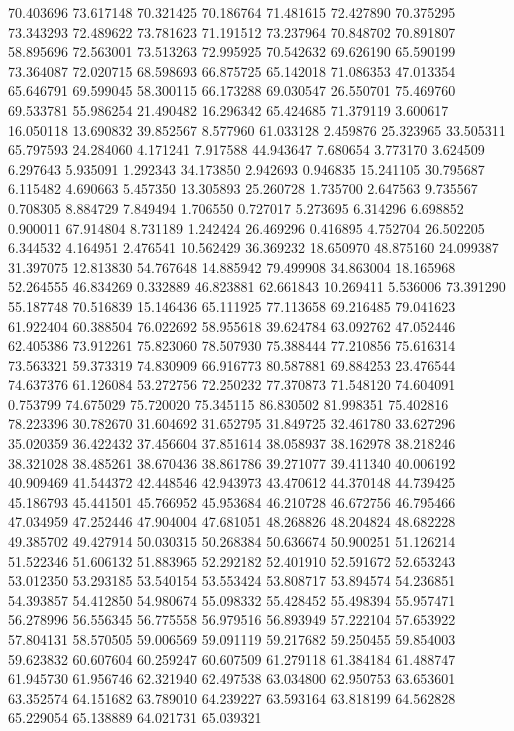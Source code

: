70.403696
73.617148
70.321425
70.186764
71.481615
72.427890
70.375295
73.343293
72.489622
73.781623
71.191512
73.237964
70.848702
70.891807
58.895696
72.563001
73.513263
72.995925
70.542632
69.626190
65.590199
73.364087
72.020715
68.598693
66.875725
65.142018
71.086353
47.013354
65.646791
69.599045
58.300115
66.173288
69.030547
26.550701
75.469760
69.533781
55.986254
21.490482
16.296342
65.424685
71.379119
3.600617
16.050118
13.690832
39.852567
8.577960
61.033128
2.459876
25.323965
33.505311
65.797593
24.284060
4.171241
7.917588
44.943647
7.680654
3.773170
3.624509
6.297643
5.935091
1.292343
34.173850
2.942693
0.946835
15.241105
30.795687
6.115482
4.690663
5.457350
13.305893
25.260728
1.735700
2.647563
9.735567
0.708305
8.884729
7.849494
1.706550
0.727017
5.273695
6.314296
6.698852
0.900011
67.914804
8.731189
1.242424
26.469296
0.416895
4.752704
26.502205
6.344532
4.164951
2.476541
10.562429
36.369232
18.650970
48.875160
24.099387
31.397075
12.813830
54.767648
14.885942
79.499908
34.863004
18.165968
52.264555
46.834269
0.332889
46.823881
62.661843
10.269411
5.536006
73.391290
55.187748
70.516839
15.146436
65.111925
77.113658
69.216485
79.041623
61.922404
60.388504
76.022692
58.955618
39.624784
63.092762
47.052446
62.405386
73.912261
75.823060
78.507930
75.388444
77.210856
75.616314
73.563321
59.373319
74.830909
66.916773
80.587881
69.884253
23.476544
74.637376
61.126084
53.272756
72.250232
77.370873
71.548120
74.604091
0.753799
74.675029
75.720020
75.345115
86.830502
81.998351
75.402816
78.223396
30.782670
31.604692
31.652795
31.849725
32.461780
33.627296
35.020359
36.422432
37.456604
37.851614
38.058937
38.162978
38.218246
38.321028
38.485261
38.670436
38.861786
39.271077
39.411340
40.006192
40.909469
41.544372
42.448546
42.943973
43.470612
44.370148
44.739425
45.186793
45.441501
45.766952
45.953684
46.210728
46.672756
46.795466
47.034959
47.252446
47.904004
47.681051
48.268826
48.204824
48.682228
49.385702
49.427914
50.030315
50.268384
50.636674
50.900251
51.126214
51.522346
51.606132
51.883965
52.292182
52.401910
52.591672
52.653243
53.012350
53.293185
53.540154
53.553424
53.808717
53.894574
54.236851
54.393857
54.412850
54.980674
55.098332
55.428452
55.498394
55.957471
56.278996
56.556345
56.775558
56.979516
56.893949
57.222104
57.653922
57.804131
58.570505
59.006569
59.091119
59.217682
59.250455
59.854003
59.623832
60.607604
60.259247
60.607509
61.279118
61.384184
61.488747
61.945730
61.956746
62.321940
62.497538
63.034800
62.950753
63.653601
63.352574
64.151682
63.789010
64.239227
63.593164
63.818199
64.562828
65.229054
65.138889
64.021731
65.039321
